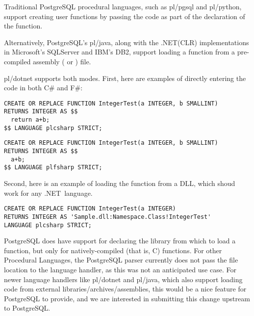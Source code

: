 \documentclass[sigconf,techreport,authorversion,nonacm]{acmart}
\newcommand{\dotnet}{.NET}
\begin{document}
Traditional PostgreSQL procedural languages, such as pl/pgsql
and pl/python, support creating user functions by passing the
code as part of the declaration of the function.

Alternatively, PostgreSQL's pl/java, along with the \dotnet (CLR)
implementations in Microsoft's SQLServer and IBM's DB2, support
loading a function from a pre-compiled assembly (
or ) file.

pl/dotnet supports both modes.  First, here are examples of directly
entering the code in both C\# and F\#:

\begin{listing}[H]
\begin{verbatim}
CREATE OR REPLACE FUNCTION IntegerTest(a INTEGER, b SMALLINT)
RETURNS INTEGER AS $$
  return a+b;
$$ LANGUAGE plcsharp STRICT;
\end{verbatim}
\end{listing}

\begin{listing}[H]
\begin{verbatim}
CREATE OR REPLACE FUNCTION IntegerTest(a INTEGER, b SMALLINT)
RETURNS INTEGER AS $$
  a+b;
$$ LANGUAGE plfsharp STRICT;
\end{verbatim}
\end{listing}

Second, here is an example of loading the function from a DLL, which
shoud work for any \dotnet\ language.

\begin{listing}[H]
\begin{verbatim}
CREATE OR REPLACE FUNCTION IntegerTest(a INTEGER)
RETURNS INTEGER AS 'Sample.dll:Namespace.Class!IntegerTest'
LANGUAGE plcsharp STRICT;
\end{verbatim}
\end{listing}

PostgreSQL does have support for declaring the library from which
to load a function, but only for natively-compiled (that is, C)
functions. For other Procedural Languages, the PostgreSQL parser
currently does not pass the file location to the language handler,
as this was not an anticipated use case. For newer language handlers
like pl/dotnet and pl/java, which also support loading code from
external libraries/archives/assemblies, this would be a nice feature
for PostgreSQL to provide, and we are interested in submitting this
change upstream to PostgreSQL.
\end{document}
